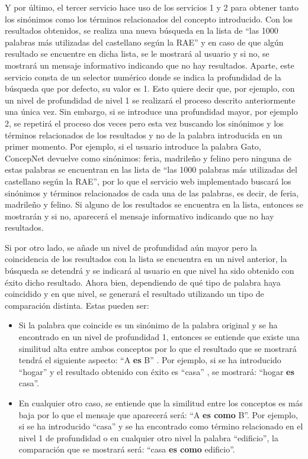 Y por último, el tercer servicio hace uso de los servicios 1 y 2 para obtener tanto los sinónimos como los términos relacionados del concepto introducido. Con los resultados obtenidos, se realiza una nueva búsqueda en la lista de ``las 1000 palabras más utilizadas del castellano según la RAE'' y en caso de que algún resultado se encuentre en dicha lista, se le mostrará al usuario y si no, se mostrará un mensaje informativo indicando que no hay resultados. Aparte, este servicio consta de un selector numérico donde se indica la profundidad de la búsqueda que por defecto, su valor es 1. Esto quiere decir que, por ejemplo, con un nivel de profundidad de nivel 1 se realizará el proceso descrito anteriormente una única vez. Sin embargo, si se introduce una profundidad mayor, por ejemplo 2, se repetirá el proceso dos veces pero esta vez buscando los sinónimos y los términos relacionados de los resultados y no de la palabra introducida en un primer momento. Por ejemplo, si el usuario introduce la palabra Gato, ConcepNet devuelve como sinónimos: feria, madrileño y felino pero ninguna de estas palabras se encuentran en las lista de ``las 1000 palabras más utilizadas del castellano según la RAE'', por lo que el servicio web implementado buscará los sinónimos y términos relacionados de cada una de las palabras, es decir, de feria, madrileño y felino. Si alguno de los resultados se encuentra en la lista, entonces se mostrarán y si no, aparecerá el mensaje informativo indicando que no hay resultados.

Si por otro lado, se añade un nivel de profundidad aún mayor pero la coincidencia de los resultados con la lista se encuentra en un nivel anterior, la búsqueda se detendrá y se indicará al usuario en que nivel ha sido obtenido con éxito dicho resultado.
Ahora bien, dependiendo de qué tipo de palabra haya coincidido y en que nivel, se generará el resultado utilizando un tipo de comparación distinta. Estas pueden ser:
\begin{itemize}
	\item Si la palabra que coincide es un sinónimo de la palabra original  y se ha encontrado en un nivel de profundidad 1, entonces se entiende que existe una similitud alta entre ambos conceptos por lo que el resultado que se mostrará tendrá el siguiente aspecto: ``A \textbf{es} B'' . Por ejemplo, si se ha introducido ``hogar'' y el resultado obtenido con éxito es ``casa'' , se mostrará: ``hogar \textbf{es} casa''.
	
	\item En cualquier otro caso, se entiende que la similitud entre los conceptos es más baja por lo que el mensaje que aparecerá será:  ``A \textbf{es como} B''. Por ejemplo, si se ha introducido ``casa'' y se ha encontrado como término relacionado en el nivel 1 de profundidad o en cualquier otro nivel la palabra ``edificio'', la comparación que se mostrará será: ``casa \textbf{es como} edificio''.
\end{itemize}


